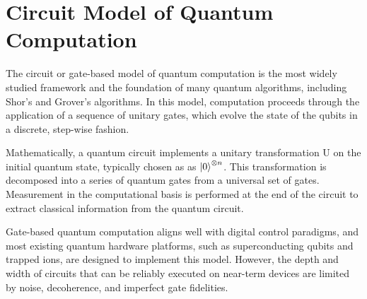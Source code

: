 \section{Circuit Model of Quantum Computation}
\label{Section:GateModelQC}

The circuit or gate-based model of quantum computation is the most widely studied
framework and the foundation of many quantum algorithms, including Shor's and Grover's
algorithms. In this model, computation proceeds through the application of a sequence
of unitary gates, which evolve the state of the qubits in a discrete, step-wise fashion.

Mathematically, a quantum circuit implements a unitary transformation U on the initial
quantum state, typically chosen as as $\ket{0}^{\otimes n}$. This transformation is
decomposed into a series of quantum gates from a universal set of gates. Measurement in
the computational basis is performed at the end of the circuit to extract classical
information from the quantum circuit.

Gate-based quantum computation aligns well with digital control paradigms, and most
existing quantum hardware platforms, such as superconducting qubits and trapped ions, are
designed to implement this model. However, the depth and width of circuits that can be
reliably executed on near-term devices are limited by noise, decoherence, and imperfect
gate fidelities.

